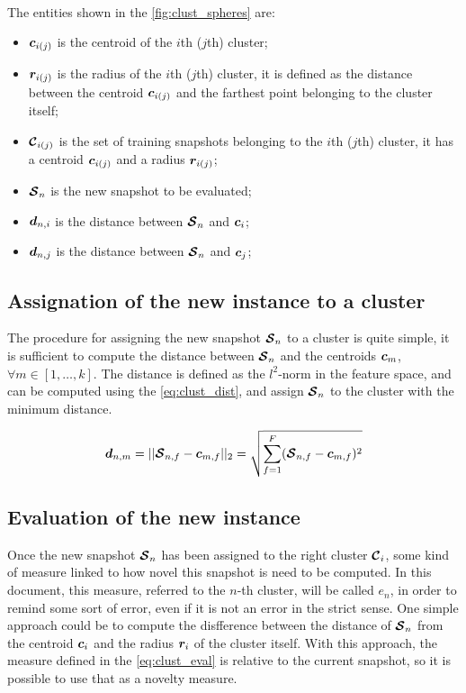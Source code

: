 \paragraph*{}
The entities shown in the \autoref{fig:clust_spheres} are:
\begin{itemize}
  \item $\bm{c}_{i(j)}$ is the centroid of the $i$th ($j$th) cluster;
  \item $\bm{r}_{i(j)}$ is the radius of the $i$th ($j$th) cluster, it is defined as the distance between the centroid $\bm{c}_{i(j)}$ and the farthest point belonging to the cluster itself;
  \item $\bm{\mathcal{C}}_{i(j)}$ is the set of training snapshots belonging to the $i$th ($j$th) cluster, it has a centroid $\bm{c}_{i(j)}$ and a radius $\bm{r}_{i(j)}$;
  \item $\bm{\mathcal{S}}_n$ is the new snapshot to be evaluated;
  \item $\bm{d}_{n,i}$ is the distance between $\bm{\mathcal{S}}_n$ and $\bm{c}_i$;
  \item $\bm{d}_{n,j}$ is the distance between $\bm{\mathcal{S}}_n$ and $\bm{c}_j$;
\end{itemize}

\subsection{Assignation of the new instance to a cluster} 
The procedure for assigning the new snapshot $\bm{\mathcal{S}}_n$ to a cluster is quite simple, it is sufficient to compute the distance between $\bm{\mathcal{S}}_n$ and the centroids $\bm{c}_m$, $\forall m \in  [1, \dots , k]$. The distance is defined as the $l^2$-norm in the feature space, and can be computed using the \autoref{eq:clust_dist}, and assign $\bm{\mathcal{S}}_n$ to the cluster with the minimum distance.

\begin{equation}
  \label{eq:clust_dist}
  \bm{d}_{n,m} = ||\bm{\mathcal{S}}_{n,f} - \bm{c}_{m,f}||_2 = \sqrt{\sum_{f=1}^{F} (\bm{\mathcal{S}}_{n,f} - \bm{c}_{m,f})^2}
\end{equation}

\subsection{Evaluation of the new instance}
Once the new snapshot $\bm{\mathcal{S}}_n$ has been assigned to the right cluster $\bm{\mathcal{C}}_i$, some kind of measure linked to how novel this snapshot is need to be computed. In this document, this measure, referred to the $n$-th cluster, will be called $e_n$, in order to remind some sort of error, even if it is not an error in the strict sense. One simple approach could be to compute the disfference between the distance of $\bm{\mathcal{S}}_n$ from the centroid $\bm{c}_i$ and the radius $\bm{r}_i$ of the cluster itself. With this approach, the measure defined in the \autoref{eq:clust_eval} is relative to the current snapshot, so it is possible to use that as a novelty measure.

